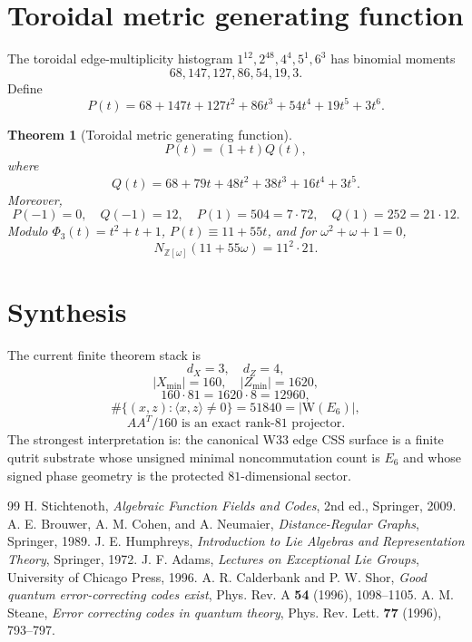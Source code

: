 \documentclass[12pt]{article}
\newtheorem{theorem}{Theorem}[section]
\newcommand{\Z}{\mathbb Z}
\newcommand{\Weyl}{\mathrm W}
\newcommand{\Xmin}{X_{\min}}
\newcommand{\Zmin}{Z_{\min}}
\begin{document}
\section{Toroidal metric generating function}

The toroidal edge-multiplicity histogram $1^{12},2^{48},4^4,5^1,6^3$ has binomial moments
\[
        68,147,127,86,54,19,3.
\]
Define
\[
        P(t)=68+147t+127t^2+86t^3+54t^4+19t^5+3t^6.
\]

\begin{theorem}[Toroidal metric generating function]
\[
        P(t)=(1+t)Q(t),
\]
where
\[
        Q(t)=68+79t+48t^2+38t^3+16t^4+3t^5.
\]
Moreover,
\[
        P(-1)=0,
        \quad
        Q(-1)=12,
        \quad
        P(1)=504=7\cdot72,
        \quad
        Q(1)=252=21\cdot12.
\]
Modulo $\Phi_3(t)=t^2+t+1$, $P(t)\equiv11+55t$, and for $\omega^2+\omega+1=0$,
\[
        N_{\Z[\omega]}(11+55\omega)=11^2\cdot21.
\]
\end{theorem}

\section{Synthesis}

The current finite theorem stack is
\[
\boxed{d_X=3,\quad d_Z=4,}
\]
\[
\boxed{|\Xmin|=160,\quad |\Zmin|=1620,}
\]
\[
\boxed{160\cdot81=1620\cdot8=12960,}
\]
\[
\boxed{\#\{(x,z):\langle x,z\rangle\ne0\}=51840=|\Weyl(E_6)|,}
\]
\[
\boxed{AA^T/160\text{ is an exact rank-}81\text{ projector}.}
\]
The strongest interpretation is: the canonical W33 edge CSS surface is a finite qutrit substrate whose unsigned minimal noncommutation count is $E_6$ and whose signed phase geometry is the protected $81$-dimensional sector.

\begin{thebibliography}{99}
 H. Stichtenoth, \textit{Algebraic Function Fields and Codes}, 2nd ed., Springer, 2009.
 A. E. Brouwer, A. M. Cohen, and A. Neumaier, \textit{Distance-Regular Graphs}, Springer, 1989.
 J. E. Humphreys, \textit{Introduction to Lie Algebras and Representation Theory}, Springer, 1972.
 J. F. Adams, \textit{Lectures on Exceptional Lie Groups}, University of Chicago Press, 1996.
 A. R. Calderbank and P. W. Shor, \textit{Good quantum error-correcting codes exist}, Phys. Rev. A \textbf{54} (1996), 1098--1105.
 A. M. Steane, \textit{Error correcting codes in quantum theory}, Phys. Rev. Lett. \textbf{77} (1996), 793--797.
\end{thebibliography}
\end{document}
